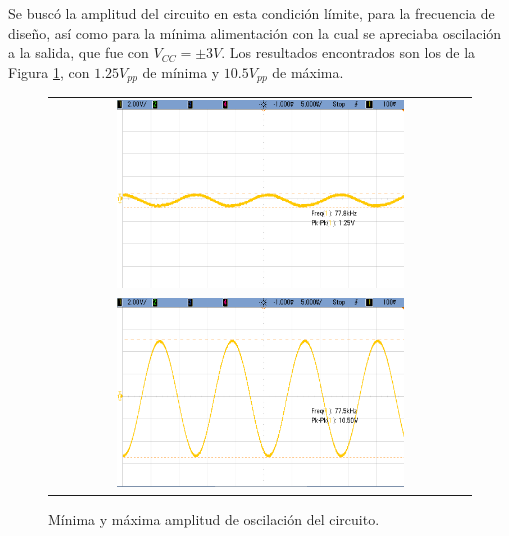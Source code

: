 Se buscó la amplitud del circuito en esta condición límite, para la frecuencia de diseño, así como para la mínima alimentación con la cual se apreciaba 
oscilación a la salida, que fue con $V_{CC} = \pm3V$.
Los resultados encontrados son los de la Figura \ref{fig:min_max_amp_ex1}, con $1.25V_{pp}$ de mínima y $10.5V_{pp}$ de máxima.
\begin{figure}[H]
    \centering
    \begin{tabular}{c}
        \includegraphics[width=0.7\textwidth]{../EJ1/Recursos/min_amp.png} \\
        \includegraphics[width=0.7\textwidth]{../EJ1/Recursos/max_amp.png}
    \end{tabular}
    \caption{Mínima y máxima amplitud de oscilación del circuito.}
    \label{fig:min_max_amp_ex1}    
\end{figure}


